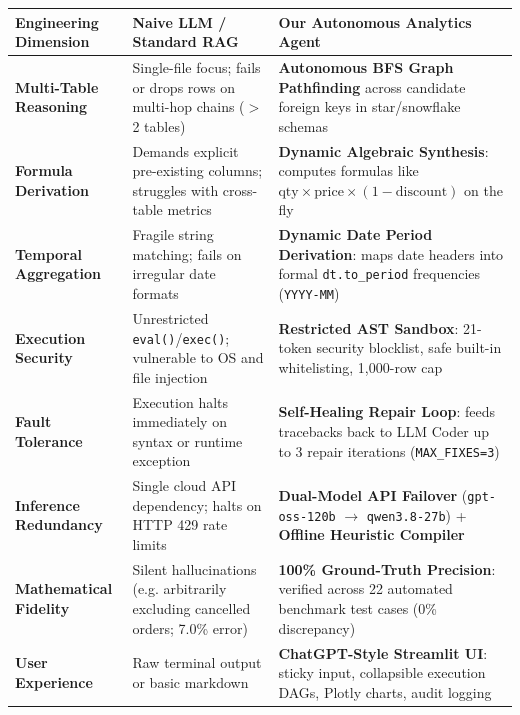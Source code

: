 \documentclass[11pt,a4paper]{article}
\begin{document}
{\footnotesize
\begin{center}
\begin{tabular}{@{}lp{4.5cm}p{7.0cm}@{}}
\toprule
Engineering Dimension & Naive LLM / Standard RAG & Our Autonomous Analytics Agent \\
\midrule
\textbf{Multi-Table Reasoning} & Single-file focus; fails or drops rows on multi-hop chains ($>$2 tables) & \textbf{Autonomous BFS Graph Pathfinding} across candidate foreign keys in star/snowflake schemas \\
\textbf{Formula Derivation} & Demands explicit pre-existing columns; struggles with cross-table metrics & \textbf{Dynamic Algebraic Synthesis}: computes formulas like $\text{qty} \times \text{price} \times (1 - \text{discount})$ on the fly \\
\textbf{Temporal Aggregation} & Fragile string matching; fails on irregular date formats & \textbf{Dynamic Date Period Derivation}: maps date headers into formal \texttt{dt.to\_period} frequencies (\texttt{YYYY-MM}) \\
\textbf{Execution Security} & Unrestricted \texttt{eval()}/\texttt{exec()}; vulnerable to OS and file injection & \textbf{Restricted AST Sandbox}: 21-token security blocklist, safe built-in whitelisting, 1,000-row cap \\
\textbf{Fault Tolerance} & Execution halts immediately on syntax or runtime exception & \textbf{Self-Healing Repair Loop}: feeds tracebacks back to LLM Coder up to 3 repair iterations (\texttt{MAX\_FIXES=3}) \\
\textbf{Inference Redundancy} & Single cloud API dependency; halts on HTTP 429 rate limits & \textbf{Dual-Model API Failover} (\texttt{gpt-oss-120b} $\rightarrow$ \texttt{qwen3.8-27b}) + \textbf{Offline Heuristic Compiler} \\
\textbf{Mathematical Fidelity} & Silent hallucinations (e.g. arbitrarily excluding cancelled orders; 7.0\% error) & \textbf{100\% Ground-Truth Precision}: verified across 22 automated benchmark test cases (0\% discrepancy) \\
\textbf{User Experience} & Raw terminal output or basic markdown & \textbf{ChatGPT-Style Streamlit UI}: sticky input, collapsible execution DAGs, Plotly charts, audit logging \\
\bottomrule
\end{tabular}
\end{center}
}

\end{document}
